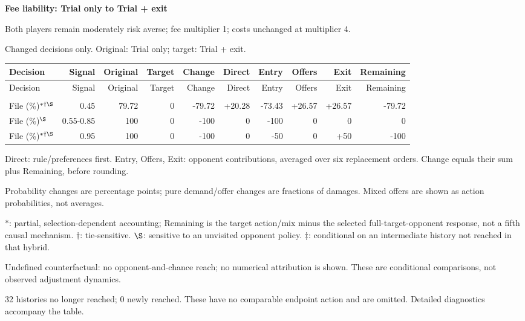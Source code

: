 \documentclass[10pt]{article}
\begin{document}
{\large\bfseries Fee liability: Trial only to Trial + exit}\par
Both players remain moderately risk averse; fee multiplier 1; costs unchanged at multiplier 4.\par
{\small Changed decisions only. Original: Trial only; target: Trial + exit.}\par
{\small\setlength{\tabcolsep}{3pt}\begin{longtable}{@{}>{\raggedright\arraybackslash}p{1.65in}rrrrrrrrr@{}}
\toprule Decision & Signal & Original & Target & Change & Direct & Entry & Offers & Exit & Remaining \\\midrule\endfirsthead
\toprule Decision & Signal & Original & Target & Change & Direct & Entry & Offers & Exit & Remaining \\\midrule\endhead
\bottomrule\endfoot
\multicolumn{10}{@{}l}{\textbf{Plaintiff}}\\
File (\%)$^{*\dagger\S}$ & 0.45 & 79.72 & 0 & -79.72 & +20.28 & -73.43 & +26.57 & +26.57 & -79.72\\
File (\%)$^{\S}$ & 0.55-0.85 & 100 & 0 & -100 & 0 & -100 & 0 & 0 & 0\\
File (\%)$^{*\dagger\S}$ & 0.95 & 100 & 0 & -100 & 0 & -50 & 0 & +50 & -100\\
\end{longtable}}
{\footnotesize Direct: rule/preferences first. Entry, Offers, Exit: opponent contributions, averaged over six replacement orders. Change equals their sum plus Remaining, before rounding.\par
Probability changes are percentage points; pure demand/offer changes are fractions of damages. Mixed offers are shown as action probabilities, not averages.\par
$*$: partial, selection-dependent accounting; Remaining is the target action/mix minus the selected full-target-opponent response, not a fifth causal mechanism. $\dagger$: tie-sensitive. $\S$: sensitive to an unvisited opponent policy. $\ddagger$: conditional on an intermediate history not reached in that hybrid.\par
Undefined counterfactual: no opponent-and-chance reach; no numerical attribution is shown. These are conditional comparisons, not observed adjustment dynamics.\par
32 histories no longer reached; 0 newly reached. These have no comparable endpoint action and are omitted. Detailed diagnostics accompany the table.}\par
{}\par
\end{document}
